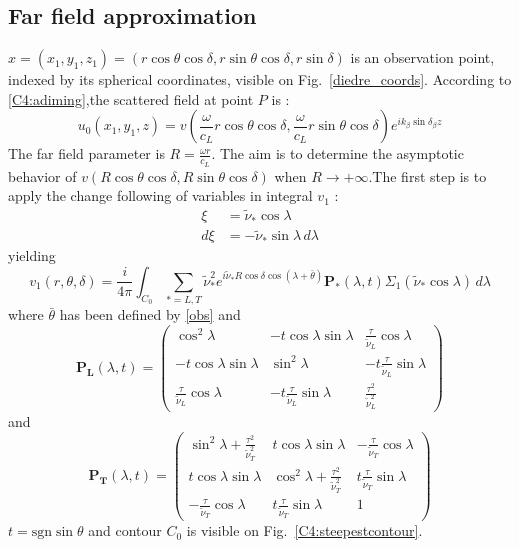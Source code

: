 \subsection{Far field approximation}
$x=(x_1,y_1,z_1)=(r\cos\theta\cos\delta,r\sin\theta\cos\delta,r\sin\delta)$ is an observation point, indexed by its spherical coordinates, visible on Fig.~\ref{diedre_coords}. According to \eqref{C4:adiming},the scattered field at point $P$ is :
\begin{equation}
u_0(x_1,y_1,z)=v(\frac{\omega}{c_L}r\cos\theta\cos\delta,\frac{\omega}{c_L}r\sin\theta\cos\delta)e^{ik_{\beta}\sin\delta_{\beta}z}
\end{equation}
The far field parameter is $R=\frac{\omega r}{c_L}$. The aim is to determine the asymptotic behavior of $v(R\cos\theta\cos\delta,R\sin\theta\cos\delta)$ when $R\rightarrow +\infty$.The first step is to apply the change following of variables in integral $v_1$ :
\begin{equation}
\begin{split}
\xi&=\tilde{\nu}_*\cos\lambda \\
d\xi&=-\tilde{\nu}_*\sin\lambda\, d\lambda
\end{split}
\label{C4:changevar2}
\end{equation}
yielding
\begin{equation}
v_1(r,\theta,\delta)=\frac{i}{4\pi} \int_{C_0}\sum_{*=L,T}\tilde{\nu}_*^2 e^{i\tilde{\nu}_*R\cos\delta\cos(\lambda+\bar{\theta})}\mathbf{ P_*}(\lambda,t)\Sigma_1(\tilde{\nu}_*\cos\lambda) \, d \lambda
\label{C4:v1C0}
\end{equation}
where $\bar{\theta}$ has been defined by \eqref{obs} and
\begin{equation}
\mathbf{P_L}(\lambda,t)=
\begin{pmatrix}
\cos^2\lambda & -t\cos\lambda\sin\lambda &\frac{\tau}{\tilde{\nu}_L} \cos\lambda \\
-t\cos\lambda\sin\lambda & \sin^2\lambda&-t\frac{\tau}{\tilde{\nu}_L}\sin\lambda \\
\frac{\tau}{\tilde{\nu}_L} \cos\lambda&-t\frac{\tau}{\tilde{\nu}_L}\sin\lambda&\frac{\tau^2}{\tilde{\nu}_L^2}
\end{pmatrix}
\end{equation}
and
\begin{equation}
\mathbf{P_T}(\lambda,t)=
\begin{pmatrix}
\sin^2\lambda+\frac{\tau^2}{\tilde{\nu}_T^2} & t\cos\lambda\sin\lambda &-\frac{\tau}{\tilde{\nu}_T}\cos\lambda \\
t\cos\lambda\sin\lambda & \cos^2\lambda+\frac{\tau^2}{\tilde{\nu}_T^2}&t\frac{\tau}{\tilde{\nu}_T}\sin\lambda \\
-\frac{\tau}{\tilde{\nu}_T}\cos\lambda&t\frac{\tau}{\tilde{\nu}_T}\sin\lambda&1
\end{pmatrix}
\end{equation}
$t=\mbox{sgn} \sin\theta$ and contour $C_0$ is visible on Fig.~\ref{C4:steepestcontour}.

